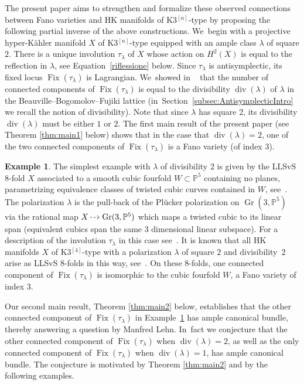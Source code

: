 \documentclass[JEP,XML,SOM,Unicode,published]{cedram}
\newcommand{\HK}{\textup{HK}\xspace}
\newcommand{\dradpl}{{\hspace*{-2.5mm}\begin{tikzcd}[ampersand replacement=\&,column sep = scriptsize]\mbox{}\ar[r,dashed]\&\mbox{}\end{tikzcd}\hspace*{-2.5mm}}}
\newcommand{\dratst}{{\hspace*{-2.5mm}\begin{tikzcd}[ampersand replacement=\&,column sep = small]\mbox{}\ar[r,dashed]\&\mbox{}\end{tikzcd}\hspace*{-2.5mm}}}
\let\drascst\dratst
\newcommand{\dra}{\mathchoice{\dradpl}{\dratst}{\drascst}{\drascst}}
\newcommand{\PP}{{\mathbb P}}\let\P\PP
\DeclareMathOperator{\divisore}{div}\let\div\divisore
\DeclareMathOperator{\Fix}{Fix}
\DeclareMathOperator{\Gr}{Gr}
\theoremstyle{definition}
\newtheorem{exam}[lemm]{Example}
\begin{document}
The present paper aims to strengthen and formalize these observed connections between Fano varieties and \HK manifolds of K3$^{[n]}$-type by proposing the following partial inverse of the above constructions. We~begin with a projective hyper-Kähler manifold $X$ of K3$^{[n]}$-type equipped with an ample class $\lambda$ of square $2$. There is a unique involution $\tau_{\lambda}$ of $X$ whose action on $H^2(X)$ is equal to the reflection in $\lambda$, see Equation~\eqref{riflessione} below. Since $\tau_{\lambda}$ is antisymplectic, its fixed locus $\Fix(\tau_{\lambda})$ is Lagrangian. We~showed in ~\cite{involutions1} that the number of connected components of $\Fix(\tau_{\lambda})$ is equal to the divisibility $\divisore(\lambda)$ of $\lambda$ in the Beauville--Bogomolov--Fujiki lattice (in~Section~\ref{subsec:AntisymplecticIntro} we recall the notion of divisibility). Note that since $\lambda$ has square 2, its divisibility $\divisore(\lambda)$ must be either $1$ or $2$.
The first main result of the present paper (see Theorem \ref{thm:main1} below) shows that in the case that $\divisore(\lambda)=2$, one of the two connected components of $\Fix(\tau_{\lambda})$ is a Fano variety (of index 3).

\begin{exam}\label{ex:LLSvS}
The simplest example with $\lambda$ of divisibility $2$ is given by the LLSvS $8$-fold $X$ associated to a smooth cubic fourfold $W\subset\PP^5$ containing no planes, parametrizing equivalence classes of twisted cubic curves contained in $W$, see~\cite{LLSvS:cubics}.
The polarization $\lambda$ is the pull-back of the Plücker polarization on $\Gr(3,\PP^5)$ via the rational map $X\dra \Gr(3,\PP^5)$ which maps a twisted cubic to its linear span (equivalent cubics span the same $3$ dimensional linear subspace).
For a description of the involution $\tau_\lambda$ in this case see~\cite{Lehn:Oberwolfach,CCL:Chow}. It is known that all \HK manifolds $X$ of K3$^{[4]}$-type with a polarization $\lambda$ of square $2$ and divisibility~$2$ arise as LLSvS $8$-folds in this way, see~\cite[Prop.\,B.12]{Debarre:Survey}. On these $8$-folds, one connected component of $\Fix(\tau_{\lambda})$ is isomorphic to the cubic fourfold $W$, a Fano variety of index $3$.
\end{exam}

Our second main result, Theorem \ref{thm:main2} below, establishes that the other connected component of $\Fix(\tau_{\lambda})$ in Example~\ref{ex:LLSvS} has ample canonical bundle, thereby answering a question by Manfred Lehn. In~fact we conjecture that the other connected component of $\Fix(\tau_{\lambda})$ when $\divisore(\lambda)=2$, as well as the only
connected component of $\Fix(\tau_{\lambda})$ when $\divisore(\lambda)=1$, has ample canonical bundle. The conjecture is motivated by Theorem \ref{thm:main2} and by the following examples.
\end{document}
